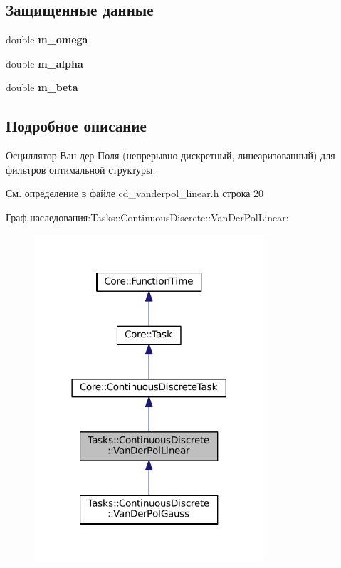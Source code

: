 \subsection*{Защищенные данные}
\begin{DoxyCompactItemize}
\item 
\hypertarget{class_tasks_1_1_continuous_discrete_1_1_van_der_pol_linear_a974f4658bee500533be49e053f15172f}{}\label{class_tasks_1_1_continuous_discrete_1_1_van_der_pol_linear_a974f4658bee500533be49e053f15172f} 
double {\bfseries m\+\_\+omega}
\item 
\hypertarget{class_tasks_1_1_continuous_discrete_1_1_van_der_pol_linear_a6e09423b369c869ea4721e465845912a}{}\label{class_tasks_1_1_continuous_discrete_1_1_van_der_pol_linear_a6e09423b369c869ea4721e465845912a} 
double {\bfseries m\+\_\+alpha}
\item 
\hypertarget{class_tasks_1_1_continuous_discrete_1_1_van_der_pol_linear_a9ca2f773ce65c2b69fea3a4a451afd59}{}\label{class_tasks_1_1_continuous_discrete_1_1_van_der_pol_linear_a9ca2f773ce65c2b69fea3a4a451afd59} 
double {\bfseries m\+\_\+beta}
\end{DoxyCompactItemize}


\subsection{Подробное описание}
Осциллятор Ван-\/дер-\/Поля (непрерывно-\/дискретный, линеаризованный) для фильтров оптимальной структуры. 

См. определение в файле cd\+\_\+vanderpol\+\_\+linear.\+h строка 20



Граф наследования\+:Tasks\+:\+:Continuous\+Discrete\+:\+:Van\+Der\+Pol\+Linear\+:
\nopagebreak
\begin{figure}[H]
\begin{center}
\leavevmode
\includegraphics[width=242pt]{class_tasks_1_1_continuous_discrete_1_1_van_der_pol_linear__inherit__graph}
\end{center}
\end{figure}


